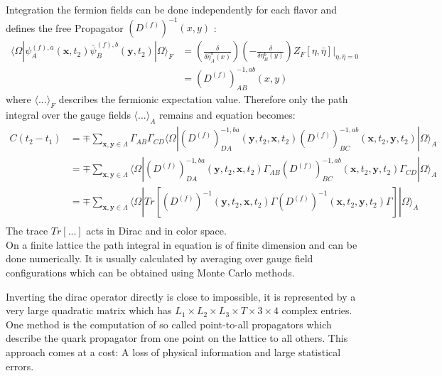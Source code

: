         \noindent
        Integration the fermion fields can be done independently for each flavor and defines the free Propagator $(D^{(f)})^{-1}(x,y)$ \cite{qcd2_script_wagner}:
        \begin{equation}
            \begin{aligned}
                \langle\Omega|\psi^{(f),a}_A(\textbf{x}, t_2)\bar{\psi}^{(f),b}_B(\textbf{y}, t_2)|\Omega\rangle_F &= 
                (\frac{\delta}{\delta\bar{\eta}^a_A(x)})(-\frac{\delta}{\delta{\eta}^b_B(y)})Z_F[\eta,\bar{\eta}]\Big |_{\eta,\bar{\eta}=0}\\
                &= (D^{(f)})_{AB}^{-1,ab}(x,y)
            \end{aligned}
        \end{equation}
        where $\langle...\rangle_F$ describes the fermionic expectation value. Therefore only the path integral over the gauge fields $\langle...\rangle_A$ remains and equation  becomes:
        \begin{equation}\label{correlator_final}
            \begin{aligned}
                C(t_2 - t_1) &= \mp \sum_{\textbf{x},\textbf{y}\in\Lambda}\Gamma_{AB}\Gamma_{CD}
                \langle\Omega|(D^{(f)})_{DA}^{-1,ba}(\textbf{y},t_2,\textbf{x},t_2)
                (D^{(f)})_{BC}^{-1,ab}(\textbf{x},t_2,\textbf{y},t_2)|\Omega\rangle_A\\
                &= \mp \sum_{\textbf{x},\textbf{y}\in\Lambda}
                \langle\Omega|(D^{(f)})_{DA}^{-1,ba}(\textbf{y},t_2,\textbf{x},t_2)\Gamma_{AB}
                (D^{(f)})_{BC}^{-1,ab}(\textbf{x},t_2,\textbf{y},t_2)\Gamma_{CD}|\Omega\rangle_A\\
                &= \mp \sum_{\textbf{x},\textbf{y}\in\Lambda}
                \langle\Omega|Tr[(D^{(f)})^{-1}(\textbf{y},t_2,\textbf{x},t_2)\Gamma
                (D^{(f)})^{-1}(\textbf{x},t_2,\textbf{y},t_2)\Gamma]|\Omega\rangle_A\\
            \end{aligned}
        \end{equation}
        The trace $Tr[...]$ acts in Dirac and in color space.\\
        
        \noindent
        On a finite lattice the path integral in equation  is of finite dimension and can be done numerically. It is usually calculated by averaging over gauge field configurations which can be obtained using Monte Carlo methods.
        
        Inverting the dirac operator directly is close to impossible, it is represented by a very large quadratic matrix which has $L_1 \times L_2 \times L_3 \times T \times 3 \times 4$ complex entries. One method is the computation of so called point-to-all propagators \cite{four_quark_correlation_functions} which describe the quark propagator from one point on the lattice to all others. This approach comes at a cost: A loss of physical information and large statistical errors.